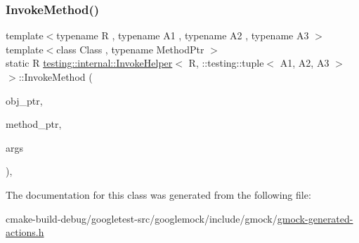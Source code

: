 \mbox{\label{classtesting_1_1internal_1_1InvokeHelper_3_01R_00_01_1_1testing_1_1tuple_3_01A1_00_01A2_00_01A3_01_4_01_4_a6b2473ea7c58ff4c2ed46c7117fa7baa}} 
\subsubsection{\texorpdfstring{InvokeMethod()}{InvokeMethod()}}
{\footnotesize\ttfamily template$<$typename R , typename A1 , typename A2 , typename A3 $>$ \\
template$<$class Class , typename Method\+Ptr $>$ \\
static R \mbox{\hyperlink{classtesting_1_1internal_1_1InvokeHelper}{testing\+::internal\+::\+Invoke\+Helper}}$<$ R, \+::testing\+::tuple$<$ A1, A2, A3 $>$ $>$\+::Invoke\+Method (\begin{DoxyParamCaption}\item[{Class $\ast$}]{obj\+\_\+ptr,  }\item[{Method\+Ptr}]{method\+\_\+ptr,  }\item[{const \+::testing\+::tuple$<$ A1, A2, A3 $>$ \&}]{args }\end{DoxyParamCaption})\hspace{0.3cm}{\ttfamily [inline]}, {\ttfamily [static]}}



The documentation for this class was generated from the following file\+:\begin{DoxyCompactItemize}
\item 
cmake-\/build-\/debug/googletest-\/src/googlemock/include/gmock/\mbox{\hyperlink{gmock-generated-actions_8h}{gmock-\/generated-\/actions.\+h}}\end{DoxyCompactItemize}
